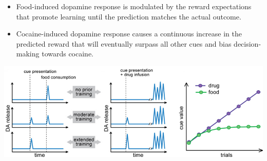 \begin{@empty}
    \small
    \begin{example}
        \phantom{}
        \begin{itemize}
            \item Food-induced dopamine response is modulated by the reward expectations that promote learning until the prediction matches the actual outcome.
            \item Cocaine-induced dopamine response causes a continuous increase in the predicted reward that
                will eventually surpass all other cues and bias decision-making towards cocaine.
        \end{itemize}
        \begin{center}
            \includegraphics[width=0.7\linewidth]{./img/dopamine_food_cocaine.png}
        \end{center}
    \end{example}
\end{@empty}